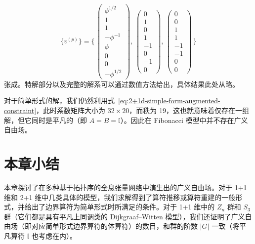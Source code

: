 \begin{equation}
  \{ v^{(p)} \} = \Biggl\{ \,
    \begin{pmatrix} \phi^{1/2} \\ 1 \\ 1 \\ -\phi^{-1} \\ \phi \\ 0 \\ 0 \\ -\phi^{1/2} \end{pmatrix}, \,
    \begin{pmatrix} 0 \\ 1 \\ 0 \\ 1 \\ -1 \\  0 \\ -1 \\ 0 \end{pmatrix}, \,
    \begin{pmatrix} 0 \\ 0 \\ 1 \\ 1 \\ -1 \\ -1 \\  0 \\ 0 \end{pmatrix} \,
  \Biggr\}
\end{equation}
张成。特解部分以及完整的解系可以通过数值方法给出，具体结果此处从略。

对于简单形式的解，我们仍然利用式~\eqref{eq:2+1d-simple-form-augmented-constraint}，此时系数矩阵大小为 $32\times20$，而秩为 19，这也就意味着仅存在一组解，但它同时是平凡的（即 $A=B=\mathbb{I}$）。因此在 Fibonacci 模型中并不存在广义自由场。

\section{本章小结}

本章探讨了在多种基于拓扑序的全息张量网络中演生出的广义自由场。对于 1+1 维和 2+1 维中几类具体的模型，我们求解得到了算符推移或算符重建的一般形式，并给出了边界算符为简单形式时所满足的条件。对于 1+1 维中的 $Z_n$ 群和 $S_3$ 群（它们都是具有平凡上同调类的 Dijkgraaf--Witten 模型），我们还证明了广义自由场（即对应简单形式边界算符的体算符）的数目，和群的阶数 $|G|$ 一致（将平凡算符 $\mathbb{I}$ 也考虑在内）。
